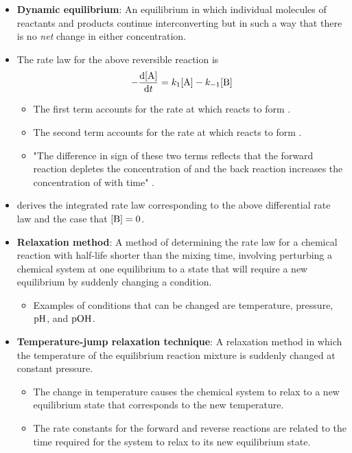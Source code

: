 \documentclass[../notes.tex]{subfiles}
\begin{document}
\begin{itemize}
\begin{equation*}
    \end{equation*}
    \item \textbf{Dynamic equilibrium}: An equilibrium in which individual molecules of reactants and products continue interconverting but in such a way that there is no \emph{net} change in either concentration.
    \item The rate law for the above reversible reaction is
    \begin{equation*}
        -\dv{[\ce{A}]}{t} = k_1[\ce{A}]-k_{-1}[\ce{B}]
    \end{equation*}
    \begin{itemize}
        \item The first term accounts for the rate at which  reacts to form .
        \item The second term accounts for the rate at which  reacts to form .
        \item "The difference in sign of these two terms reflects that the forward reaction depletes the concentration of  and the back reaction increases the concentration of  with time" \parencite[1063]{bib:McQuarrieSimon}.
    \end{itemize}
    \item \textcite{bib:McQuarrieSimon} derives the integrated rate law corresponding to the above differential rate law and the case that $[\ce{B}]=0$.
    \item \textbf{Relaxation method}: A method of determining the rate law for a chemical reaction with half-life shorter than the mixing time, involving perturbing a chemical system at one equilibrium to a state that will require a new equilibrium by suddenly changing a condition.
    \begin{itemize}
        \item Examples of conditions that can be changed are temperature, pressure, $\operatorname{pH}$, and $\operatorname{pOH}$.
    \end{itemize}
    \item \textbf{Temperature-jump relaxation technique}: A relaxation method in which the temperature of the equilibrium reaction mixture is suddenly changed at constant pressure.
    \begin{itemize}
        \item The change in temperature causes the chemical system to relax to a new equilibrium state that corresponds to the new temperature.
        \item The rate constants for the forward and reverse reactions are related to the time required for the system to relax to its new equilibrium state.

\end{itemize}
\end{itemize}
\end{document}
